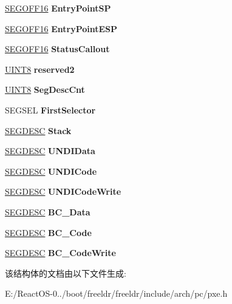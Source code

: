 \begin{DoxyCompactItemize}
\hyperlink{structs___s_e_g_o_f_f16}{S\+E\+G\+O\+F\+F16} {\bfseries Entry\+Point\+SP}
\item 
\mbox{\label{structs___p_x_e_adedffc3fb6057a4ccda80e3323ef2ed1}} 
\hyperlink{structs___s_e_g_o_f_f16}{S\+E\+G\+O\+F\+F16} {\bfseries Entry\+Point\+E\+SP}
\item 
\mbox{\label{structs___p_x_e_aee749bb210c186314d2968e6013048f2}} 
\hyperlink{structs___s_e_g_o_f_f16}{S\+E\+G\+O\+F\+F16} {\bfseries Status\+Callout}
\item 
\mbox{\label{structs___p_x_e_aebeed285bcc9a04dea4683ed8d7dfb63}} 
\hyperlink{_processor_bind_8h_ab27e9918b538ce9d8ca692479b375b6a}{U\+I\+N\+T8} {\bfseries reserved2}
\item 
\mbox{\label{structs___p_x_e_ab7aca842172bd0105de1c0e37fe824b0}} 
\hyperlink{_processor_bind_8h_ab27e9918b538ce9d8ca692479b375b6a}{U\+I\+N\+T8} {\bfseries Seg\+Desc\+Cnt}
\item 
\mbox{\label{structs___p_x_e_afcd3d99694e1b7ad293910fa835d408d}} 
S\+E\+G\+S\+EL {\bfseries First\+Selector}
\item 
\mbox{\label{structs___p_x_e_af6dd1f95d85326713bb1728047ed5588}} 
\hyperlink{structs___s_e_g_d_e_s_c}{S\+E\+G\+D\+E\+SC} {\bfseries Stack}
\item 
\mbox{\label{structs___p_x_e_a945d71a4a2b6c00166ef5402e52cae83}} 
\hyperlink{structs___s_e_g_d_e_s_c}{S\+E\+G\+D\+E\+SC} {\bfseries U\+N\+D\+I\+Data}
\item 
\mbox{\label{structs___p_x_e_a175346bcaf9607a8978fea397f3af932}} 
\hyperlink{structs___s_e_g_d_e_s_c}{S\+E\+G\+D\+E\+SC} {\bfseries U\+N\+D\+I\+Code}
\item 
\mbox{\label{structs___p_x_e_a9b39f6fb0c6e509d2fc65db6abb32e64}} 
\hyperlink{structs___s_e_g_d_e_s_c}{S\+E\+G\+D\+E\+SC} {\bfseries U\+N\+D\+I\+Code\+Write}
\item 
\mbox{\label{structs___p_x_e_a89608085a738040bb991f8d3f41d3b29}} 
\hyperlink{structs___s_e_g_d_e_s_c}{S\+E\+G\+D\+E\+SC} {\bfseries B\+C\+\_\+\+Data}
\item 
\mbox{\label{structs___p_x_e_a2fdc59e45eeed779e9ea4a322395af8e}} 
\hyperlink{structs___s_e_g_d_e_s_c}{S\+E\+G\+D\+E\+SC} {\bfseries B\+C\+\_\+\+Code}
\item 
\mbox{\label{structs___p_x_e_a0540386cf739b91e0ff3fcebf6c74f7f}} 
\hyperlink{structs___s_e_g_d_e_s_c}{S\+E\+G\+D\+E\+SC} {\bfseries B\+C\+\_\+\+Code\+Write}
\end{DoxyCompactItemize}


该结构体的文档由以下文件生成\+:\begin{DoxyCompactItemize}
\item 
E\+:/\+React\+O\+S-\/0../boot/freeldr/freeldr/include/arch/pc/pxe.\+h\end{DoxyCompactItemize}
